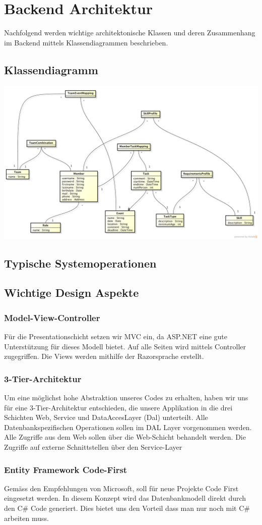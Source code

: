 \chapter{Backend Architektur}
	Nachfolgend werden wichtige architektonische Klassen und deren Zusammenhang im Backend mittels Klassendiagrammen beschrieben.

	\section{Klassendiagramm}
	\includegraphics[width=\textwidth]{content/architekturdokumentation/images/datenmodell.png}
	
	\section{Typische Systemoperationen}

	\section{Wichtige Design Aspekte}
		\subsection{Model-View-Controller}
		Für die Presentationschicht setzen wir MVC ein, da ASP.NET eine gute Unterstützung für dieses Modell bietet. Auf alle Seiten wird mittels Controller zugegriffen. Die Views werden mithilfe der Razorsprache erstellt.

		\subsection{3-Tier-Architektur}
		Um eine möglichst hohe Abstraktion unseres Codes zu erhalten, haben wir uns für eine 3-Tier-Architektur entschieden, die unsere Applikation in die drei Schichten Web, Service und DataAccesLayer (Dal) unterteilt. Alle Datenbankspezifischen Operationen sollen im DAL Layer vorgenommen werden. Alle Zugriffe aus dem Web sollen über die Web-Schicht behandelt werden. Die Zugriffe auf externe Schnittstellen über den Service-Layer

		\subsection{Entity Framework Code-First}
		Gemäss den Empfehlungen von Microsoft, soll für neue Projekte Code First eingesetzt werden. In diesem Konzept wird das Datenbankmodell direkt durch den C# Code generiert. Dies bietet uns den Vorteil dass man nur noch mit C# arbeiten muss.